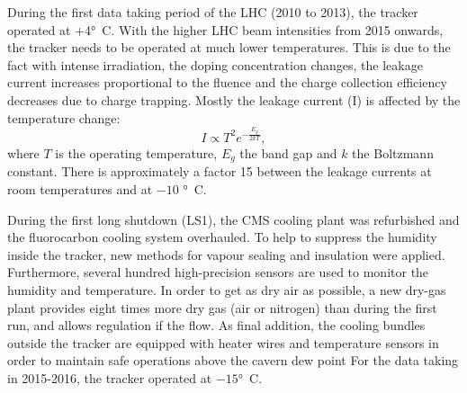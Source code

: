   
  
  
   During the first data taking period of the LHC (2010 to 2013), the tracker operated at +4\si{ \degree C}. With the higher LHC beam intensities from 2015 onwards, the tracker needs to be operated at much lower temperatures. This is due to the fact with intense irradiation, the doping concentration changes, the leakage current increases proportional to the fluence and the charge collection efficiency decreases due to charge trapping. Mostly the leakage current (I) is affected by the temperature change: 
   \begin{equation}
   I \propto T^2 e^{-\frac{E_g}{2kT}}, 
   \end{equation}
    where $T$ is the operating temperature, $E_g$ the band gap and $k$ the Boltzmann constant. There is approximately a factor 15 between the leakage currents at room temperatures and at $-10$ \si{ \degree C}. 
    
    During the first long shutdown (LS1), the CMS cooling plant was refurbished\cite{running:1998606} and the fluorocarbon cooling system overhauled. To help to suppress the humidity inside the tracker, new methods for vapour sealing and insulation were applied. Furthermore, several hundred high-precision sensors are used to monitor the humidity and temperature. In order to get as dry air as possible, a new dry-gas plant provides eight times more dry gas (air or nitrogen) than during the first run, and allows regulation if the flow. As final addition, the cooling bundles outside the tracker are equipped with heater wires and temperature sensors in order to maintain safe operations above the cavern dew point For the data taking in 2015-2016, the tracker operated at $-15$\si{ \degree C}.
    
